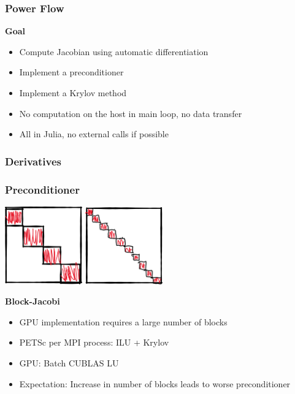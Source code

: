 \begin{frame}
  \frametitle{Power Flow}
  {\bf Goal}
  \begin{itemize}
    \item Compute Jacobian using automatic differentiation
    \item Implement a preconditioner
    \item Implement a Krylov method
    \item No computation on the host in main loop, no data transfer
    \item All in Julia, no external calls if possible
  \end{itemize}
\end{frame}

\begin{frame}
  \frametitle{Derivatives}
\end{frame}

\begin{frame}
  \frametitle{Preconditioner}
  \begin{center}
    \includegraphics[width=0.25\textwidth]{figures/mpiblocks}
    \includegraphics[width=0.25\textwidth]{figures/gpublocks}
  \end{center}
  {\bf Block-Jacobi}
  \begin{itemize}
    \item GPU implementation requires a large number of blocks
    \item PETSc per MPI process: ILU + Krylov 
    \item GPU: Batch CUBLAS LU
    \item Expectation: Increase in number of blocks leads to worse preconditioner
  \end{itemize}
\end{frame}

